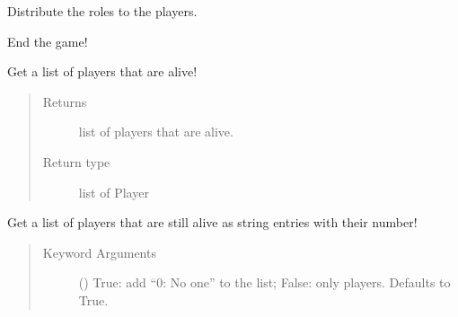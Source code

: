\documentclass[letterpaper,10pt,english]{sphinxmanual}
\begin{document}
\begin{fulllineitems}
\begin{fulllineitems}
\label{\detokenize{chatwolf:chatwolf.game.Game.dist_roles}}
Distribute the roles to the players.

\end{fulllineitems}


\begin{fulllineitems}
\label{\detokenize{chatwolf:chatwolf.game.Game.end}}
End the game!

\end{fulllineitems}


\begin{fulllineitems}
\label{\detokenize{chatwolf:chatwolf.game.Game.get_alive}}
Get a list of players that are alive!
\begin{quote}\begin{description}
\item[{Returns}] \leavevmode
list of players that are alive.

\item[{Return type}] \leavevmode
list of Player

\end{description}\end{quote}

\end{fulllineitems}


\begin{fulllineitems}
\label{\detokenize{chatwolf:chatwolf.game.Game.get_alive_string}}
Get a list of players that are still alive as string entries with their number!
\begin{quote}\begin{description}
\item[{Keyword Arguments}] \leavevmode
{} (\sphinxstyleliteralemphasis{\sphinxupquote{, }}) \textendash{} True: add “0: No one” to the list; False: only players. Defaults to True.


\end{description}
\end{quote}
\end{fulllineitems}
\end{fulllineitems}
\end{document}
